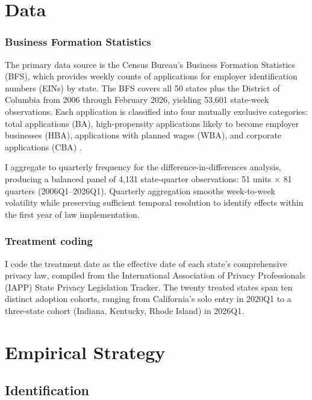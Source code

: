 \documentclass[12pt]{article}
\begin{document}
\section{Data}
\label{sec:data}

\subsubsection*{Business Formation Statistics} The primary data source is the Census Bureau's Business Formation Statistics (BFS), which provides weekly counts of applications for employer identification numbers (EINs) by state. The BFS covers all 50 states plus the District of Columbia from 2006 through February 2026, yielding 53,601 state-week observations. Each application is classified into four mutually exclusive categories: total applications (BA), high-propensity applications likely to become employer businesses (HBA), applications with planned wages (WBA), and corporate applications (CBA) \citep{bayard2018}.

I aggregate to quarterly frequency for the difference-in-differences analysis, producing a balanced panel of 4,131 state-quarter observations: 51 units $\times$ 81 quarters (2006Q1--2026Q1). Quarterly aggregation smooths week-to-week volatility while preserving sufficient temporal resolution to identify effects within the first year of law implementation.

\subsubsection*{Treatment coding} I code the treatment date as the effective date of each state's comprehensive privacy law, compiled from the International Association of Privacy Professionals (IAPP) State Privacy Legislation Tracker. The twenty treated states span ten distinct adoption cohorts, ranging from California's solo entry in 2020Q1 to a three-state cohort (Indiana, Kentucky, Rhode Island) in 2026Q1.




\section{Empirical Strategy}
\label{sec:strategy}

\subsection{Identification}
\end{document}

